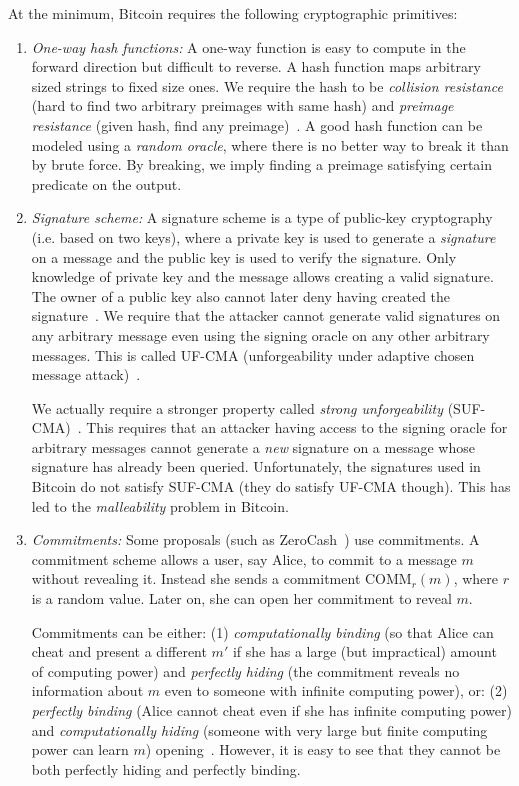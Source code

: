 \documentclass[]{report}   %
\begin{document}
At the minimum, Bitcoin requires the following cryptographic primitives:
\begin{enumerate}
	\item {\em One-way hash functions:} A one-way function is easy to compute in the forward direction but difficult to reverse. A hash function maps arbitrary sized strings to fixed size ones. We require the hash to be {\em collision resistance} (hard to find two arbitrary preimages with same hash) and {\em preimage resistance} (given hash, find any preimage)~\cite{schneier1996one}. A good hash function can be modeled using a {\em random oracle}, where there is no better way to break it than by brute force. By breaking, we imply finding a preimage satisfying certain predicate on the output.
	\item {\em Signature scheme:} A signature scheme is a type of public-key cryptography (i.e. based on two keys), where a private key is used to generate a {\em signature} on a message and the public key is used to verify the signature. Only knowledge of private key and the message allows creating a valid signature. The owner of a public key also cannot later deny having created the signature~\cite{schneier1996one}.
	We require that the attacker cannot generate valid signatures on any arbitrary message even using the signing oracle on any other arbitrary messages. This is called UF-CMA (unforgeability under adaptive chosen message attack)~\cite{schneier1996one}.
	
	We actually require a stronger property called {\em strong unforgeability} (SUF-CMA)~\cite{boneh2006strongly}. This requires that an attacker having access to the signing oracle for arbitrary messages cannot generate a {\em new} signature on a message whose signature has already been queried. Unfortunately, the signatures used in Bitcoin do not satisfy SUF-CMA (they do satisfy UF-CMA though). This has led to the {\em malleability} problem in Bitcoin.
	\item {\em Commitments:} Some proposals (such as ZeroCash~\cite{sasson2014zerocash}) use commitments. A commitment scheme allows a user, say Alice, to commit to a message $m$ without revealing  it. Instead she sends a commitment COMM$_r(m)$, where $r$ is a random value. Later on, she can open her commitment to reveal $m$.
	
	Commitments can be either: (1) {\em computationally binding}
	(so that Alice can cheat and present a different $m'$ if she has a large (but impractical) amount of computing power) and {\em perfectly hiding} (the commitment reveals no information about $m$ even to someone with infinite computing power), or: (2) {\em perfectly binding} (Alice cannot cheat even if she has infinite computing power) and {\em computationally hiding} (someone with very large but finite computing power can learn $m$) opening~\cite{damgaard1999commitment}. However, it is easy to see that they cannot be both perfectly hiding and perfectly binding.
\end{enumerate}
\end{document}
